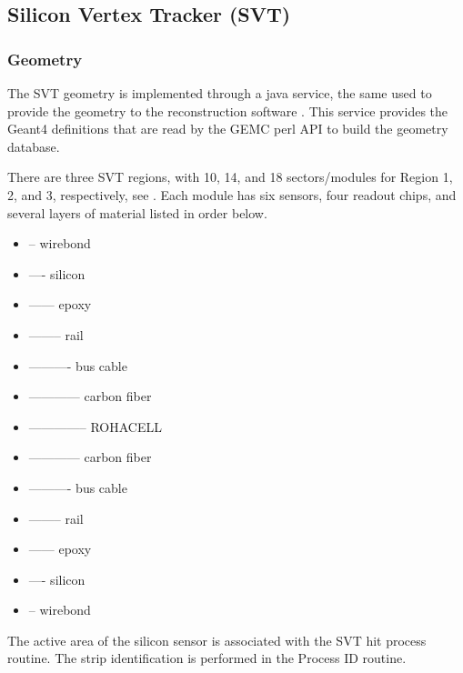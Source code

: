 \subsection{Silicon Vertex Tracker (SVT)}


\subsubsection{Geometry}


The SVT \cite{svt2019} geometry is implemented through a java service, the same used to provide the geometry
to the reconstruction software \cite{reco2019}.
This service provides the Geant4 definitions that are read by the GEMC perl API to build the geometry database.

There are three SVT regions, with 10, 14, and 18 sectors/modules for Region 1, 2, and 3, respectively, see .
Each module has six sensors, four readout chips, and several layers of material listed in order below.

\begin{itemize}
	\item -- wirebond
	\item ---- silicon
	\item ------ epoxy
	\item -------- rail
	\item ---------- bus cable
	\item ------------ carbon fiber
	\item -------------- ROHACELL
	\item ------------ carbon fiber
	\item ---------- bus cable
	\item -------- rail
	\item ------ epoxy
	\item ---- silicon
	\item -- wirebond
\end{itemize}

The active area of the silicon sensor is associated with the SVT hit process routine.
The strip identification is performed in the Process ID routine.

